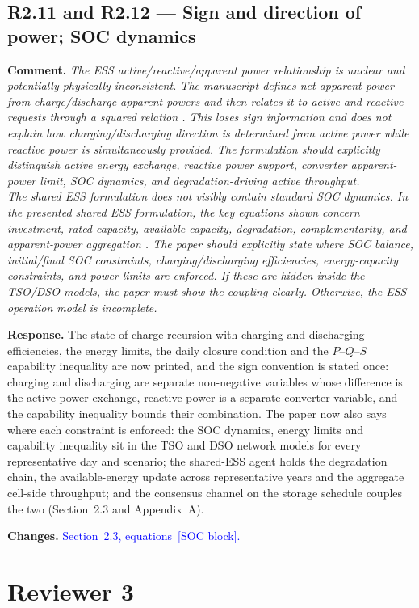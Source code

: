 \documentclass[11pt]{article}
\newcommand{\rcomment}[1]{\par\medskip\noindent\textbf{Comment.} \textit{#1}\par\smallskip}
\newcommand{\rresponse}[1]{\noindent\textbf{Response.} #1\par\smallskip}
\newcommand{\rchanges}[1]{\noindent\textbf{Changes.} \textcolor{blue}{#1}\par\medskip}
\begin{document}
\subsection*{R2.11 and R2.12 --- Sign and direction of power; SOC dynamics}
\rcomment{
The ESS active/reactive/apparent power relationship is unclear and potentially physically inconsistent. The manuscript defines net apparent power from charge/discharge apparent powers and then relates it to active and reactive requests through a squared relation . This loses sign information and does not explain how charging/discharging direction is determined from active power while reactive power is simultaneously provided. The formulation should explicitly distinguish active energy exchange, reactive power support, converter apparent-power limit, SOC dynamics, and degradation-driving active throughput.\\
The shared ESS formulation does not visibly contain standard SOC dynamics. In the presented shared ESS formulation, the key equations shown concern investment, rated capacity, available capacity, degradation, complementarity, and apparent-power aggregation . The paper should explicitly state where SOC balance, initial/final SOC constraints, charging/discharging efficiencies, energy-capacity constraints, and power limits are enforced. If these are hidden inside the TSO/DSO models, the paper must show the coupling clearly. Otherwise, the ESS operation model is incomplete.
}
\rresponse{The state-of-charge recursion with charging and discharging efficiencies, the energy limits, the
daily closure condition and the $P$--$Q$--$S$ capability inequality are now printed, and the sign
convention is stated once: charging and discharging are separate non-negative variables whose difference
is the active-power exchange, reactive power is a separate converter variable, and the capability
inequality bounds their combination. The paper now also says where each constraint is enforced: the SOC
dynamics, energy limits and capability inequality sit in the TSO and DSO network models for every
representative day and scenario; the shared-ESS agent holds the degradation chain, the available-energy
update across representative years and the aggregate cell-side throughput; and the consensus channel on
the storage schedule couples the two (Section~2.3 and Appendix~A).}
\rchanges{Section~2.3, equations~[SOC block].}

\section*{Reviewer 3}
\end{document}
